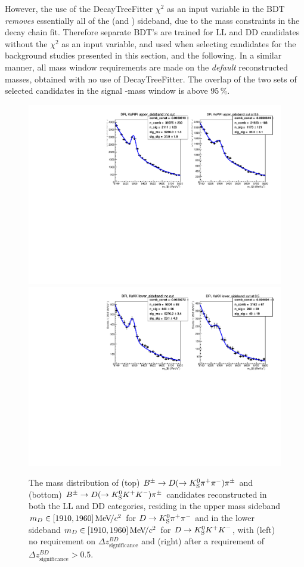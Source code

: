 However, the use of the DecayTreeFitter $\chi^2$ as an input variable in the BDT \emph{removes} essentially all of the \D (and \KS) sideband, due to the mass constraints in the decay chain fit. Therefore separate BDT's are trained for LL and DD candidates without the $\chi^2$ as an input variable, and used when selecting candidates for the background studies presented in this section, and the following. In a similar manner, all mass window requirements are made on the \emph{default} reconstructed masses, obtained with no use of DecayTreeFitter. The overlap of the two sets of selected candidates in the signal \B-mass window is above 95\,\%.

\begin{figure}[tbp]
    \centering
    \includegraphics[width=0.6\columnwidth]{figures/analysis/charmless_ANA_Pi_PiPi_bothLLDD_Run1and2_c_upper_sideband_BD_ZSIG.pdf}
    \includegraphics[width=0.6\columnwidth]{figures/analysis/charmless_ANA_Pi_KK_bothLLDD_Run1and2_c_lower_sideband_BD_ZSIG.pdf}
    \caption{The \B mass distribution of (top) ${{B}^\pm}\rightarrow{\ensuremath{D}}(\rightarrow{\ensuremath{{K}^0_{\mathrm{S}}}}{\ensuremath{{\pi}^+}}{\ensuremath{{\pi}^-}}){{\pi}^\pm}$ and (bottom) ${{B}^\pm}\rightarrow{\ensuremath{D}}(\rightarrow{\ensuremath{{K}^0_{\mathrm{S}}}}{\ensuremath{{K}^+}}{\ensuremath{{K}^-}}){{\pi}^\pm}$ candidates reconstructed in both the LL and DD categories, residing in the upper \D mass sideband $m_D\in [1910, 1960]\text{\,Me\kern -0.1em V\!/}c^2$ for $D\rightarrow{\ensuremath{{K}^0_{\mathrm{S}}}}{\ensuremath{{\pi}^+}}{\ensuremath{{\pi}^-}}$ and in the lower sideband $m_D\in [1910, 1960]\text{\,Me\kern -0.1em V\!/}c^2$ for ${D}\rightarrow{\ensuremath{{K}^0_{\mathrm{S}}}}{\ensuremath{{K}^+}}{\ensuremath{{K}^-}}$, with (left) no requirement on $\Delta z^{BD}_{\text{significance}}$ and (right) after a requirement of $\Delta z^{BD}_{\text{significance}} > 0.5$. }
    \label{fig:charmless_Bmass_DPi}
\end{figure}


